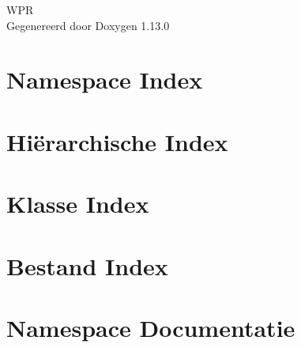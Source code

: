 \documentclass[twoside]{book}
\newcommand{\+}{\discretionary{\mbox{\scriptsize$\hookleftarrow$}}{}{}}
\newcommand{\clearemptydoublepage}{%
    \newpage{\pagestyle{empty}\cleardoublepage}%
  }
\begin{document}
  \raggedbottom
    \hypersetup{pageanchor=false,
                bookmarksnumbered=true,
                pdfencoding=unicode
               }
  \begin{titlepage}
  \vspace*{7cm}
  \begin{center}%
  {\Large WPR}\\
  \vspace*{1cm}
  {\large Gegenereerd door Doxygen 1.13.0}\\
  \end{center}
  \end{titlepage}
  \clearemptydoublepage
  \tableofcontents
  \clearemptydoublepage
  \hypersetup{pageanchor=true}
\chapter{Namespace Index}

\chapter{Hiërarchische Index}

\chapter{Klasse Index}

\chapter{Bestand Index}

\chapter{Namespace Documentatie}






























\end{document}
